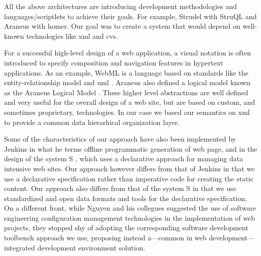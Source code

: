 \documentclass{elsart}
\begin{document}
All the above architectures are introducing development methodologies and languages/scriptlets to achieve their goals. For example, Strudel with StruQL
and Araneus with homer. Our goal was to create a system
that would depend on well-known technologies like {\sc xml} and {\sc cvs}.

For a successful high-level design of a web application,
a visual notation is often introduced to specify composition and navigation features in
hypertext applications.
As an example, WebML \cite{CFB00} is a language based on standards like
the entity-relationship model \cite{Che76}
and {\sc uml} \cite{UML}.
Araneus also defined a logical model known as the Araneus Logical Model \cite{MAM03}.
These higher level abstractions are well defined and very useful for the overall design of a web site, but are based on custom,
and sometimes proprietary, technologies.
In our case we based our semantics on {\sc xml} to provide a common data hierarhical organization layer.

Some of the characteristics of our approach have also been implemented by
Jenkins \cite{Jen04} in what he terms
offline programmatic generation of web page, and in the design
of the system S \cite{SCK02}, which uses a
declarative approach for managing data intensive web sites.
Our approach however differs from that of Jenkins
in that we use a declarative specification
rather than imperative code for creating the static content.
Our approach also differs from that of the system S in that
we use standardized and open data formats and tools for the
declarative specification.
On a different front, while Nguyen and his collegues \cite{NMT04}
suggested the use of software engineering configuration management technologies
in the implementation of web projects, they stopped shy of adopting
the corresponding software development toolbench approach we use,
proposing instead a---common in web development---integrated
development environment solution.
\end{document}
